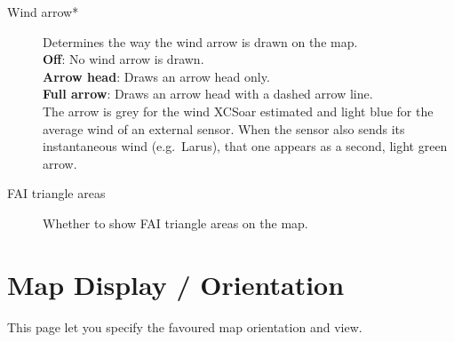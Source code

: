 \begin{description}
\item[Wind arrow*]  Determines the way the wind arrow is drawn on the map. \\
  {\bf Off}: No wind arrow is drawn. \\
  {\bf Arrow head}: Draws an arrow head only. \\
  {\bf Full arrow}: Draws an arrow head with a dashed arrow line. \\
  The arrow is grey for the wind XCSoar estimated and light blue for
  the average wind of an external sensor.  When the sensor also sends
  its instantaneous wind (e.g.\ Larus), that one appears as a second,
  light green arrow.
\item[FAI triangle areas] Whether to show FAI triangle areas on the map.
  
\end{description}


\section{Map Display / Orientation}\label{sec:map-projection}

This page let you specify the favoured map orientation and view.

